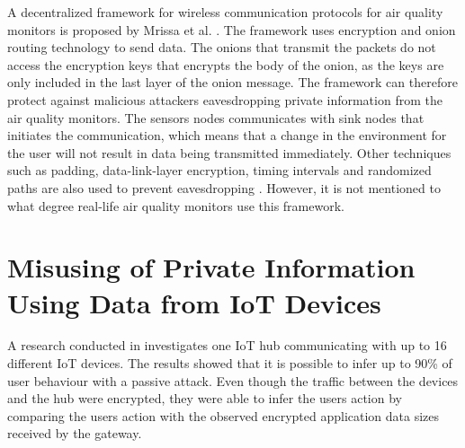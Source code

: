 A decentralized framework for wireless communication protocols for air quality monitors is proposed by Mrissa et al. \cite{PrivacyAndFrameworkDecentAQM}. The framework uses encryption and onion routing technology to send data. The onions that transmit the packets do not access the encryption keys that encrypts the body of the onion, as the keys are only included in the last layer of the onion message. The framework can therefore protect against malicious attackers eavesdropping private information from the air quality monitors. The sensors nodes communicates with sink nodes that initiates the communication, which means that a change in the environment for the user will not result in data being transmitted immediately. Other techniques such as padding, data-link-layer encryption, timing intervals and randomized paths are also used to prevent eavesdropping \cite{PrivacyAndFrameworkDecentAQM}. However, it is not mentioned to what degree real-life air quality monitors use this framework. 

\section{Misusing of Private Information Using Data from IoT Devices}
A research conducted in \cite{PassiveInferenceIoT} investigates one \gls{IoT} hub communicating with up to 16 different \gls{IoT} devices. The results showed that it is possible to infer up to 90\% of user behaviour with a passive attack. Even though the traffic between the devices and the hub were encrypted, they were able to infer the users action by comparing the users action with the observed encrypted application data sizes received by the gateway. 

